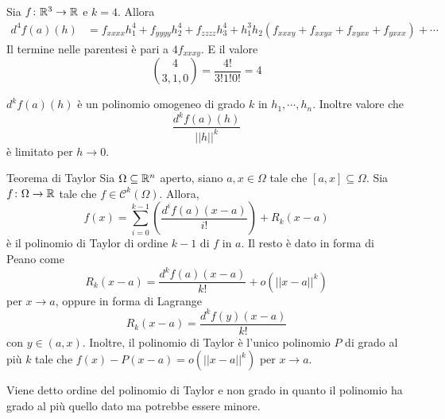 \documentclass[a4paper]{article}
\begin{document}
\begin{radioactive}
\begin{snippetexample}{}
    Sia \(f \colon \mathbb{R}^3 \to \mathbb{R}\)
    e \(k=4\). Allora
    \begin{align*}
        d^4f(a)(h) &= f_{xxxx}h_1^4
        + f_{yyyy}h_2^4 + f_{zzzz}h_3^4
        + h_1^3h_2 \left(
            f_{xxxy} + f_{xxyx} + f_{xyxx} + f_{yxxx}
        \right) + \cdots
    \end{align*}
    Il termine nelle parentesi è pari a \(4 f_{xxxy}\).
    E il valore
    \[
        \binom{4}{3,1,0} = \frac{4!}{3!1!0!} = 4
    \]
\end{snippetexample}
\end{radioactive}

\begin{radioactive}
\(d^k f(a)(h)\) è un polinomio omogeneo di grado \(k\)
in \(h_1, \cdots, h_n\).
Inoltre valore che
\[
    \frac{d^k f(a)(h)}{||h||^k}
\]
è limitato per \(h\to 0\).
\end{radioactive}

\begin{radioactive}
\begin{snippettheorem}{Teorema di Taylor}
    Sia \(\Omega \subseteq \mathbb{R}^n\) aperto,
    siano \(a,x \in \Omega\) tale che \([a,x] \subseteq \Omega\).
    Sia \(f \colon \Omega \to \mathbb{R}\) tale che \(f \in \mathcal{C}^k(\Omega)\).
    Allora,
    \[
        f(x) = \sum_{i=0}^{k-1} \left(\frac{d^{i}f(a)(x-a)}{i!}\right) + R_k(x-a)
    \]
    è il polinomio di Taylor di ordine \(k-1\) di \(f\) in \(a\).
    Il resto è dato in forma di Peano come
    \[
        R_k(x-a) = \frac{d^k f(a)(x-a)}{k!} + o(||x-a||^k)
    \]
    per \(x \to a\), oppure in forma di Lagrange
    \[
        R_k(x-a) = \frac{d^k f(y)(x-a)}{k!}
    \]
    con \(y \in (a,x)\).
    Inoltre, il polinomio di Taylor
    è l'unico polinomio \(P\) di grado al più \(k\) tale che
    \(f(x)-P(x-a)=o(||x-a||^k)\) per \(x\to a\).
\end{snippettheorem}
\end{radioactive}

\begin{radioactive}    
    Viene detto ordine del polinomio di Taylor e non grado in quanto
    il polinomio ha grado al più quello dato ma potrebbe essere minore.
\end{radioactive}
\end{document}
